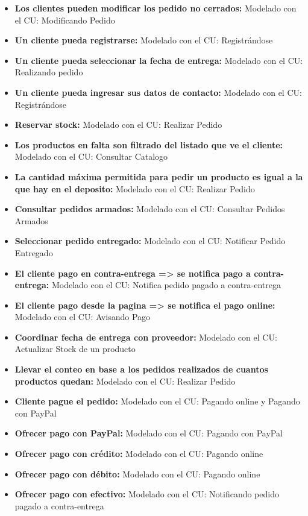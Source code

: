 \begin{itemize}
\item \textbf{Los clientes pueden modificar los pedido no cerrados:} Modelado con el CU: Modificando Pedido
\item \textbf{Un cliente pueda registrarse:} Modelado con el CU: Registrándose
\item \textbf{Un cliente pueda seleccionar la fecha de entrega:} Modelado con el CU:  Realizando pedido
\item \textbf{Un cliente pueda ingresar sus datos de contacto:} Modelado con el CU: Registrándose
\item \textbf{Reservar stock:} Modelado con el CU: Realizar Pedido
\item \textbf{Los productos en falta son filtrado del listado que ve el cliente:} Modelado con el CU: Consultar Catalogo
\item \textbf{La cantidad máxima permitida para pedir un producto es igual a la que hay en el deposito:} Modelado con el CU: Realizar Pedido
\item \textbf{Consultar pedidos armados:} Modelado con el CU: Consultar Pedidos Armados
\item \textbf{Seleccionar pedido entregado:} Modelado con el CU: Notificar Pedido Entregado
\item \textbf{El cliente pago en contra-entrega => se notifica pago a contra-entrega:} Modelado con el CU: Notifica pedido pagado a contra-entrega
\item \textbf{El cliente pago desde la pagina => se notifica el pago online:} Modelado con el CU: Avisando Pago
\item \textbf{Coordinar fecha de entrega con proveedor:} Modelado con el CU: Actualizar Stock de un producto
\item \textbf{Llevar el conteo en base a los pedidos realizados de cuantos productos quedan:} Modelado con el CU: Realizar Pedido
\item \textbf{Cliente pague el pedido:} Modelado con el CU: Pagando online y Pagando con PayPal
\item \textbf{Ofrecer pago con PayPal:} Modelado con el CU: Pagando con PayPal
\item \textbf{Ofrecer pago con crédito:} Modelado con el CU: Pagando online
\item \textbf{Ofrecer pago con débito:} Modelado con el CU: Pagando online
\item \textbf{Ofrecer pago con efectivo:} Modelado con el CU: Notificando pedido pagado a contra-entrega
 
\end{itemize}

\newpage